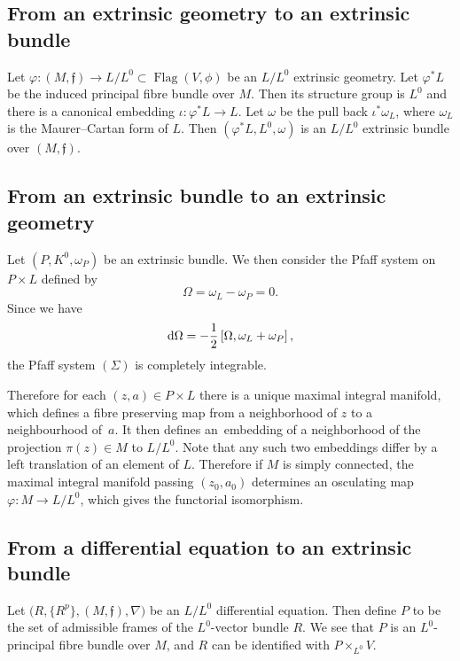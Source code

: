 \documentclass[pdftex]{sigma}%
\newcommand{\f}{\mathfrak f}
\newcommand{\om}{\omega}
\newcommand{\Flag}{\operatorname{Flag}}
\numberwithin{equation}{section}
\begin{document}
\subsection{From an extrinsic geometry to an extrinsic bundle}\vspace{-.5mm}

Let $\varphi \colon (M,\f)\to L/L^0\subset \Flag(V,\phi)$ be an $L/L^0$ extrinsic geometry. Let $\varphi^*L$ be the induced principal fibre bundle over $M$. Then its structure group is $L^0$ and there is a canonical embedding $\iota\colon \varphi^*L\to L$. Let $\om$ be the pull back $\iota^*\om_L$, where $\om_L$ is the Maurer--Cartan form of $L$. Then $(\varphi^*L,L^0,\om)$ is an $L/L^0$ extrinsic bundle over $(M,\f)$.
\vspace{-.5mm}

\subsection{From an extrinsic bundle to an extrinsic geometry}

Let $\left(P,K^0,\om_P\right)$ be an extrinsic bundle. We then consider the Pfaff system on $P\times L$ defined by\vspace{-.5mm}
\[
\Omega = \om_L-\om_P = 0.\tag{$\Sigma$}
\]
Since we have\vspace{-.5mm}
\[
{\rm d}\Omega = -\frac12\left[\Omega, \om_L + \om_P\right],
\]
the Pfaff system $(\Sigma)$ is completely integrable.

Therefore for each $(z,a)\in P\times L$ there is a unique maximal integral manifold, which defines a fibre preserving map from a neighborhood of $z$ to a neighbourhood of~$a$. It then defines an~embedding of a neighborhood of the projection $\pi(z) \in M$ to $L/L^0$. Note that any such two embeddings differ by a left translation of an element of $L$.
Therefore
if $M$ is simply connected, the maximal integral manifold passing $(z_0, a_0) $ determines an osculating map
$\varphi\colon M \to L/L^0$, which gives the functorial isomorphism.


\subsection{From a differential equation to an extrinsic bundle}
	Let $\big(R, \{R^p\}, (M,\f), \nabla\big)$ be an $L/L^0$ differential equation. Then define $P$ to be the set of admissible frames of the $L^0$-vector bundle $R$. We see that $P$ is an $L^0$-principal fibre bundle over $M$, and $R$ can be identified with $P\times_{L^0} V$.
	
\end{document}
